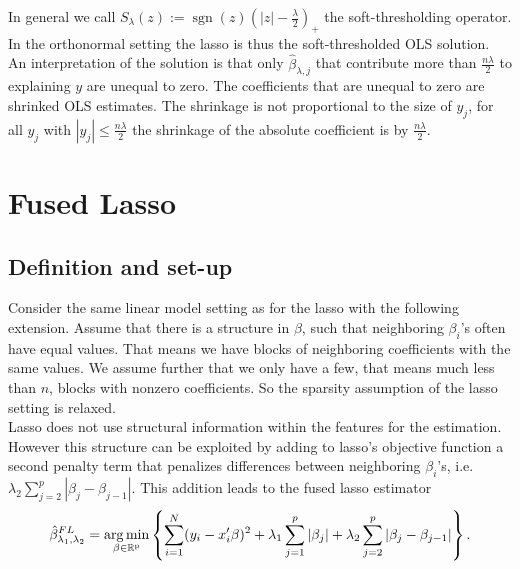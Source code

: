 \documentclass{article}
\theoremstyle{definition}
\DeclareMathOperator*{\argmin}{arg\,min}
\DeclareMathOperator*{\sgn}{sgn}
\begin{document}
\noindent In general we call $S_\lambda(z) := \sgn(z)(|z|-\frac{\lambda}{2})_+$ the soft-thresholding operator. In the orthonormal setting the lasso is thus the soft-thresholded OLS solution.
An interpretation of the solution is that only $\hat\beta_{\lambda,j}$ that contribute more than $\frac{n\lambda}{2}$ to explaining $y$ are unequal to zero. The coefficients that are unequal to zero are shrinked OLS estimates. The shrinkage is not proportional to the size of $y_j$, for all $y_j$ with $|y_j|\leq \frac{n\lambda}{2}$ the shrinkage of the absolute coefficient is by $\frac{n\lambda}{2}$.

\section{Fused Lasso}

\subsection{Definition and set-up}

Consider the same linear model setting as for the lasso with the following extension. Assume that there is a structure in $\beta$, such that neighboring $\beta_i$'s often have equal values. That means we have blocks of neighboring coefficients with the same values. We assume further that we only have a few, that means much less than $n$, blocks with nonzero coefficients. So the sparsity assumption of the lasso setting is relaxed.\\
Lasso does not use structural information within the features for the estimation. However this structure can be exploited by adding to lasso's objective function a second penalty term that penalizes differences between neighboring $\beta_i$'s, i.e. $\lambda_2\sum_{j=2}^p|\beta_j- \beta_{j-1}|$. This addition leads to the fused lasso estimator 
	\begin{equation}\label{eq: fusedlasso}
		\hat{\beta}_{\lambda_1,\lambda_2}^{FL}=\argmin_{\beta \in\rm \mathbb{R}^p} \left\{   \sum_{i=1}^{N}(y_{i}-x_{i}'\beta)^2+\lambda_1 \sum_{j=1}^p|\beta_j|+ \lambda_2 \sum_{j=2}^p|\beta_j- \beta_{j-1}| \right \}.
	\end{equation}
	
\end{document}
